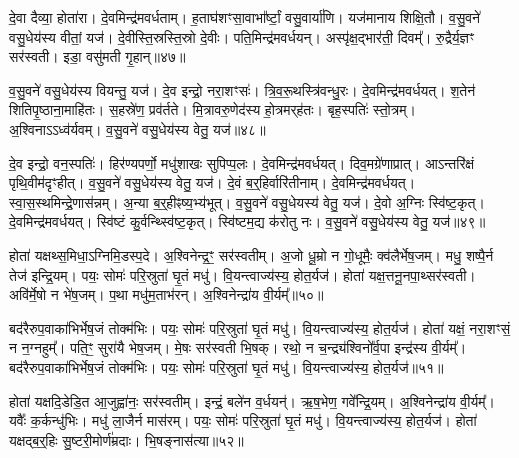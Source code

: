 दे॒वा दैव्या॒ होता॑रा।
दे॒वमिन्द्र॑मवर्धताम्।
ह॒ताघ॑शꣳसा॒वा\-भा᳚र्ष्टां॒ वसु॒वार्या॑णि।
यज॑मानाय शिक्षि॒तौ।
व॒सु॒वने॑ वसु॒धेय॑स्य वीतां॒ यज॑।
दे॒वीस्ति॒स्रस्ति॒स्रो दे॒वीः।
पति॒मिन्द्र॑मवर्धयन्।
अस्पृ॑क्ष॒द्भार॑ती॒ दिवम्᳚।
रु॒द्रैर्य॒ज्ञꣳ सर॑स्वती।
इडा॒ वसु॑मती गृ॒हान्॥४७॥\ip

व॒सु॒वने॑ वसु॒धेय॑स्य वियन्तु॒ यज॑।
दे॒व इन्द्रो॒ नरा॒शꣳसः॑।
त्रि॒व॒रू॒थस्त्रि॑वन्धु॒रः।
दे॒वमिन्द्र॑मवर्धयत्।
श॒तेन॑ शिति\-पृ॒ष्ठाना॒माहि॑तः।
स॒हस्रे॑ण॒ प्रव॑र्तते।
मि॒त्रावरु॒णेद॑स्य हो॒त्रमर्‌\mbox{}ह॑तः।
बृह॒स्पतिः॑ स्तो॒त्रम्।
अ॒श्विना\-ऽऽध्व॑र्यवम्।
व॒सु॒वने॑ वसु॒धेय॑स्य वेतु॒ यज॑॥४८॥\ip

दे॒व इन्द्रो॒ वन॒स्पतिः॑।
हिर॑ण्यपर्णो॒ मधु॑शाखः सुपिप्प॒लः।
दे॒वमिन्द्र॑मवर्धयत्।
दिव॒मग्रे॑णाप्रात्।
आऽन्तरि॑क्षं पृथि॒वीम॑दृꣳहीत्।
व॒सु॒वने॑ वसु॒धेय॑स्य वेतु॒ यज॑।
दे॒वं ब॒र्॒हिर्वारि॑तीनाम्।
दे॒वमिन्द्र॑मवर्धयत्।
स्वा॒स॒स्थमिन्द्रे॒णा\-स॑न्नम्।
अ॒न्या ब॒र्॒हीꣴष्य॒भ्य॑\-भूत्।
व॒सु॒वने॑ वसु॒धेयस्य॑ वेतु॒ यज॑।
दे॒वो अ॒ग्निः स्वि॑ष्ट॒\-कृत्।
दे॒वमिन्द्र॑मवर्धयत्।
स्वि॑ष्टं कु॒र्वन्थ्स्वि॑ष्ट॒\-कृत्।
स्वि॑ष्टम॒द्य क॑रोतु नः।
व॒सु॒वने॑ वसु॒धेय॑स्य वेतु॒ यज॑॥४९॥\ip{}

होता॑ यक्षथ्स॒मिधा॒\-ऽग्निमि॒डस्प॒दे।
अ॒श्विनेन्द्र॒ꣳ॒ सर॑स्वतीम्।
अ॒जो धू॒म्रो न गो॒धूमैः॒ क्व॑लैर्भेष॒जम्।
मधु॒ शष्पै॒र्न तेज॑ इन्द्रि॒यम्।
पयः॒ सोमः॑ परि॒स्रुता॑ घृ॒तं मधु॑।
वि॒यन्त्वाज्य॑स्य॒ होत॒र्यज॑।
होता॑ यक्ष॒त्तनू॒नपा॒थ्सर॑स्वती।
अवि॑र्मे॒षो न भे॑ष॒जम्।
प॒था मधु॑म॒ताभ॑रन्।
अ॒श्विनेन्द्रा॑य वी॒र्यम्᳚॥५०॥\ip

बद॑रैरुप॒वाका॑भिर्भेष॒जं तोक्म॑भिः।
पयः॒ सोमः॑ परि॒स्रुता॑ घृ॒तं मधु॑।
वि॒यन्त्वाज्य॑स्य॒ होत॒र्यज॑।
होता॑ यक्षं॒ नरा॒शꣳसं॒ न न॒ग्नहुम्᳚।
पति॒ꣳ॒ सुरा॑यै भेष॒जम्।
मे॒षः सर॑स्वती भि॒षक्।
रथो॒ न च॒न्द्र्य॑श्विनो᳚र्व॒पा इन्द्र॑स्य वी॒र्यम्᳚।
बद॑रैरुप॒वाका॑भिर्भेष॒जं तोक्म॑भिः।
पयः॒ सोमः॑ परि॒स्रुता॑ घृ॒तं मधु॑।
वि॒यन्त्वाज्य॑स्य॒ होत॒र्यज॑॥५१॥\ip

होता॑ यक्षदि॒डेडि॒त आ॒जुह्वा॑नः॒ सर॑स्वतीम्।
इन्द्रं॒ बले॑न व॒र्धयन्॑।
ऋ॒ष॒भेण॒ गवे᳚न्द्रि॒यम्।
अ॒श्विनेन्द्रा॑य वी॒र्यम्᳚।
यवैः᳚ क॒र्कन्धु॑भिः।
मधु॑ ला॒जैर्न मास॑रम्।
पयः॒ सोमः॑ परि॒स्रुता॑ घृ॒तं मधु॑।
वि॒यन्त्वाज्य॑स्य॒ होत॒र्यज॑।
होता॑ यक्षद्ब॒र्॒हिः सु॒ष्टरी॒मोर्ण॑म्रदाः।
भि॒षङ्नास॑त्या॥५२॥\ip

